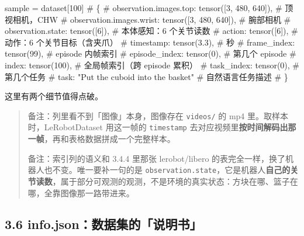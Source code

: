 \documentclass[
  chinese,
]{ctexart}
\newenvironment{Shaded}{\begin{snugshade}}{\end{snugshade}}
\newcommand{\CommentTok}[1]{\textcolor[rgb]{0.37,0.37,0.37}{#1}}
\newcommand{\DecValTok}[1]{\textcolor[rgb]{0.68,0.00,0.00}{#1}}
\newcommand{\NormalTok}[1]{\textcolor[rgb]{0.00,0.23,0.31}{#1}}
\newcommand{\OperatorTok}[1]{\textcolor[rgb]{0.37,0.37,0.37}{#1}}
\begin{document}
\begin{Shaded}
\begin{Highlighting}[]
\NormalTok{sample }\OperatorTok{=}\NormalTok{ dataset[}\DecValTok{100}\NormalTok{]}
\CommentTok{\# \{}
\CommentTok{\#   \textquotesingle{}observation.images.top\textquotesingle{}:   tensor([3, 480, 640]),  \# 顶视相机，CHW}
\CommentTok{\#   \textquotesingle{}observation.images.wrist\textquotesingle{}: tensor([3, 480, 640]),  \# 腕部相机}
\CommentTok{\#   \textquotesingle{}observation.state\textquotesingle{}:        tensor([6]),            \# 本体感知：6 个关节读数}
\CommentTok{\#   \textquotesingle{}action\textquotesingle{}:                   tensor([6]),            \# 动作：6 个关节目标（含夹爪）}
\CommentTok{\#   \textquotesingle{}timestamp\textquotesingle{}:                tensor(3.3),            \# 秒}
\CommentTok{\#   \textquotesingle{}frame\_index\textquotesingle{}:              tensor(99),             \# episode 内帧索引}
\CommentTok{\#   \textquotesingle{}episode\_index\textquotesingle{}:            tensor(0),              \# 第几个 episode}
\CommentTok{\#   \textquotesingle{}index\textquotesingle{}:                    tensor(100),            \# 全局帧索引（跨 episode 累积）}
\CommentTok{\#   \textquotesingle{}task\_index\textquotesingle{}:               tensor(0),              \# 第几个任务}
\CommentTok{\#   \textquotesingle{}task\textquotesingle{}: "Put the cuboid into the basket"            \# 自然语言任务描述}
\CommentTok{\# \}}
\end{Highlighting}
\end{Shaded}

这里有两个细节值得点破。

\begin{quote}
备注：列里看不到「图像」本身，图像存在 \texttt{videos/} 的 mp4
里。取样本时，LeRobotDataset 用这一帧的 \texttt{timestamp}
去对应视频里\textbf{按时间解码出那一帧}，再和表格数据拼成一个完整样本。

备注：索引列的语义和 3.4.4 里那张 lerobot/libero
的表完全一样，换了机器人也不变。唯一要补一句的是
\texttt{observation.state}，它是机器人\textbf{自己的关节读数}，属于部分可观测的观测，不是环境的真实状态：方块在哪、篮子在哪，全靠图像那一路带进来。
\end{quote}

\subsection{3.6
info.json：数据集的「说明书」}\label{info.jsonux6570ux636eux96c6ux7684ux8bf4ux660eux4e66}
\end{document}

